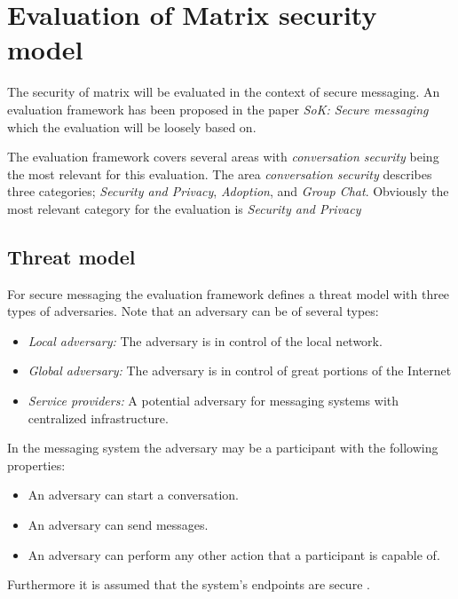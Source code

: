 
\section{Evaluation of Matrix security model}\label{evaluationofmatrix}
The security of matrix will be evaluated in the context of secure messaging. An evaluation framework has been proposed in the paper \emph{SoK: Secure messaging} which the evaluation will be loosely based on. 

The evaluation framework covers several areas with \emph{conversation security} being the most relevant for this evaluation. The area \emph{conversation security} describes three categories; \emph{Security and Privacy}, \emph{Adoption}, and \emph{Group Chat}. Obviously the most relevant category for the evaluation is \emph{Security and Privacy}

\subsection{Threat model}
For secure messaging the evaluation framework defines a threat model with three types of adversaries. Note that an adversary can be of several types:

\begin{itemize}
	\item \emph{Local adversary:} The adversary is in control of the local network.
	\item \emph{Global adversary:} The adversary is in control of great portions of the Internet 
	\item \emph{Service providers:} A potential adversary for messaging systems with centralized infrastructure.
\end{itemize}

In the messaging system the adversary may be a participant with the following properties:

\begin{itemize}
	\item An adversary can start a conversation.
	\item An adversary can send messages.
	\item An adversary can perform any other action that a participant is capable of.
\end{itemize}

Furthermore it is assumed that the system's endpoints are secure \cite{sok}.

